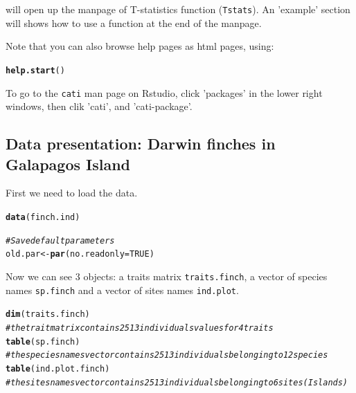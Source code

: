 \documentclass[12pt]{article}\usepackage[]{graphicx}\usepackage[]{color}
\makeatletter
\newcommand{\hlnum}[1]{\textcolor[rgb]{0.686,0.059,0.569}{#1}}%
\newcommand{\hlcom}[1]{\textcolor[rgb]{0.678,0.584,0.686}{\textit{#1}}}%
\newcommand{\hlstd}[1]{\textcolor[rgb]{0.345,0.345,0.345}{#1}}%
\newcommand{\hlkwb}[1]{\textcolor[rgb]{0.69,0.353,0.396}{#1}}%
\newcommand{\hlkwc}[1]{\textcolor[rgb]{0.333,0.667,0.333}{#1}}%
\newcommand{\hlkwd}[1]{\textcolor[rgb]{0.737,0.353,0.396}{\textbf{#1}}}%
\newenvironment{kframe}{%
 \def\at@end@of@kframe{}%
 \ifinner\ifhmode%
  \def\at@end@of@kframe{\end{minipage}}%
  \begin{minipage}{\columnwidth}%
 \fi\fi%
 \def\FrameCommand##1{\hskip\@totalleftmargin \hskip-\fboxsep
 \colorbox{shadecolor}{##1}\hskip-\fboxsep
     \hskip-\linewidth \hskip-\@totalleftmargin \hskip\columnwidth}%
 \MakeFramed {\advance\hsize-\width
   \@totalleftmargin\z@ \linewidth\hsize
   \@setminipage}}%
 {\par\unskip\endMakeFramed%
 \at@end@of@kframe}
\newenvironment{knitrout}{}{} %
\makeatother
\begin{document}
will open up the manpage of T-statistics function (\texttt{Tstats}).
An 'example' section will shows how to use a function at the end of the manpage. 

Note that you can also browse help pages as html pages, using:
\begin{knitrout}
\color{fgcolor}\begin{kframe}
\begin{alltt}
\hlkwd{help.start}\hlstd{()}
\end{alltt}
\end{kframe}
\end{knitrout}

To go to the \texttt{cati} man page on Rstudio, click 'packages' in the lower right windows, then clik 'cati', and 'cati-package'.

\subsection{Data presentation: Darwin finches in Galapagos Island}

First we need to load the data.
\begin{knitrout}
\color{fgcolor}\begin{kframe}
\begin{alltt}
\hlkwd{data}\hlstd{(finch.ind)}

\hlcom{#Save default parameters}
\hlstd{old.par}\hlkwb{<-}\hlkwd{par}\hlstd{(}\hlkwc{no.readonly} \hlstd{=} \hlnum{TRUE}\hlstd{)}
\end{alltt}
\end{kframe}
\end{knitrout}

Now we can see 3 objects: a traits matrix \texttt{traits.finch}, a vector of species names \texttt{sp.finch} and a vector of sites names \texttt{ind.plot}. 
\begin{knitrout}
\color{fgcolor}\begin{kframe}
\begin{alltt}
\hlkwd{dim}\hlstd{(traits.finch)}
\hlcom{#the trait matrix contains 2513 individuals values for 4 traits}
\hlkwd{table}\hlstd{(sp.finch)}
\hlcom{#the species names vector contains 2513 individuals belonging to 12 species}
\hlkwd{table}\hlstd{(ind.plot.finch)}
\hlcom{#the sites names vector contains 2513 individuals belonging to 6 sites (Islands)}
\end{alltt}
\end{kframe}
\end{knitrout}
\end{document}
